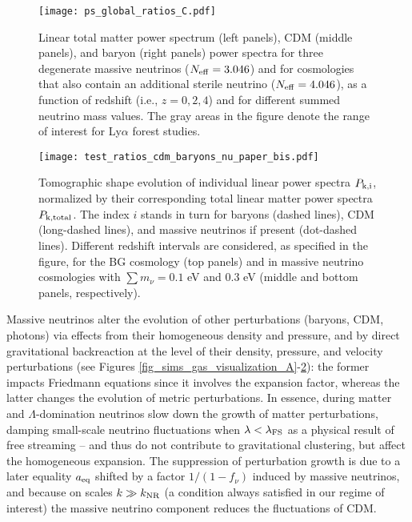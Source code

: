 \documentclass{emulateapj}
\begin{document}
\begin{figure*}
\centering
\texttt{[image: ps\_global\_ratios\_C.pdf]}
\caption{Linear total matter power spectrum (left panels), CDM (middle panels), and baryon (right panels) power spectra for three degenerate massive neutrinos ($N_{\rm eff}=3.046$) 
and for cosmologies that also contain an additional sterile neutrino ($N_{\rm eff}=4.046$),  as a  function of redshift (i.e., $z=0,2,4$) and for different 
summed neutrino mass values. The gray areas in the figure denote the range of interest for Ly$\alpha$ forest studies.}
\label{fig_nu_linear_2}
\end{figure*} 


\begin{figure*}
\centering
\texttt{[image: test\_ratios\_cdm\_baryons\_nu\_paper\_bis.pdf]} 
\caption{Tomographic shape evolution of individual  linear power spectra $P_{\rm k, i}$, 
normalized by  their corresponding
 total linear matter power spectra $P_{\rm k, total}$. 
The index 
$i$ stands in turn for baryons (dashed lines), CDM (long-dashed lines), and massive neutrinos if present (dot-dashed lines). 
 Different redshift intervals are considered, as specified in the figure, for the BG cosmology (top panels) and in massive neutrino cosmologies with  $\sum m_{\nu}=0.1$ eV and $0.3$ eV 
(middle and bottom panels, respectively).}
\label{fig_3dps_components}
\end{figure*} 
 

Massive neutrinos  
alter the evolution of other perturbations (baryons, CDM, photons)
via effects from their homogeneous density and pressure, and by 
direct gravitational backreaction at the level of their density, pressure, and velocity perturbations (see Figures \ref{fig_sims_gas_visualization_A}-\ref{fig_3dps_components}): the former impacts 
Friedmann equations since it involves the expansion factor, whereas
the latter changes the evolution of metric perturbations. 
In essence, 
 during matter and $\Lambda$-domination  
neutrinos slow down the growth of matter perturbations, damping  
small-scale neutrino fluctuations when $\lambda < \lambda_{\rm FS}$ as a  physical result of free streaming -- and thus do not contribute to gravitational clustering, but affect the homogeneous expansion. 
The suppression of perturbation growth is due to a later equality $a_{\rm eq}$ shifted by a factor $1/(1-f_{\nu})$ induced by massive neutrinos, and
because on scales $k \gg k_{\rm NR}$ (a condition always satisfied in our regime of interest) the massive neutrino component reduces the fluctuations of CDM.
\end{document}

